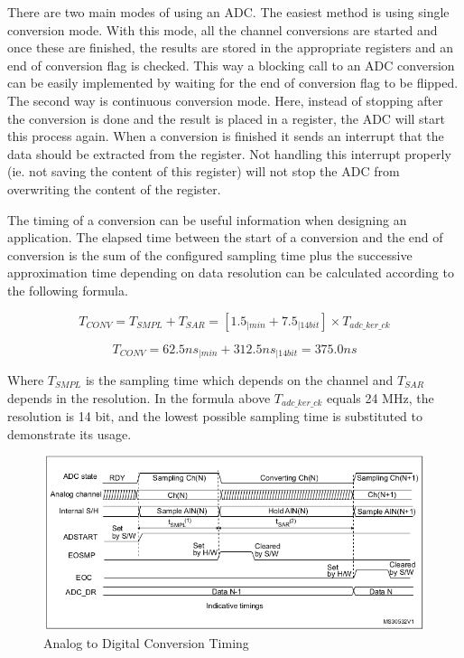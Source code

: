 There are two main modes of using an ADC. The easiest method is using single conversion mode. With this mode, all the channel conversions are started and once these are finished, the results are stored in the appropriate registers and an end of conversion flag is checked. This way a blocking call to an ADC conversion can be easily implemented by waiting for the end of conversion flag to be flipped. The second way is continuous conversion mode. Here, instead of stopping after the conversion is done and the result is placed in a register, the ADC will start this process again. When a conversion is finished it sends an interrupt that the data should be extracted from the register. Not handling this interrupt properly (ie. not saving the content of this register) will not stop the ADC from overwriting the content of the register.

The timing of a conversion can be useful information when designing an application. The elapsed time between the start of a conversion and the end of conversion is the sum of the configured sampling time plus the successive approximation time depending on data resolution can be calculated according to the following formula.

\[T_{CONV} = T_{SMPL} + T_{SAR} = [1.5_{|min} + 7.5_{|14bit}] \times T_{adc\_ker\_ck}\]

\[ T_{CONV} = 62.5 ns_{|min} + 312.5 ns_{|14bit} = 375.0 ns\]

Where $T_{SMPL}$ is the sampling time which depends on the channel and $T_{SAR}$ depends in the resolution. In the formula above $T_{adc\_ker\_ck}$ equals 24 MHz, the resolution is 14 bit, and the lowest possible sampling time is substituted to demonstrate its usage.

\begin{figure}[H]
    \centering
    \includegraphics[width=150mm, keepaspectratio]{figures/adc-timing.png}
    \caption{Analog to Digital Conversion Timing\cite{ADConversionTime}}
    \label{fig:adc-timing}
\end{figure}

